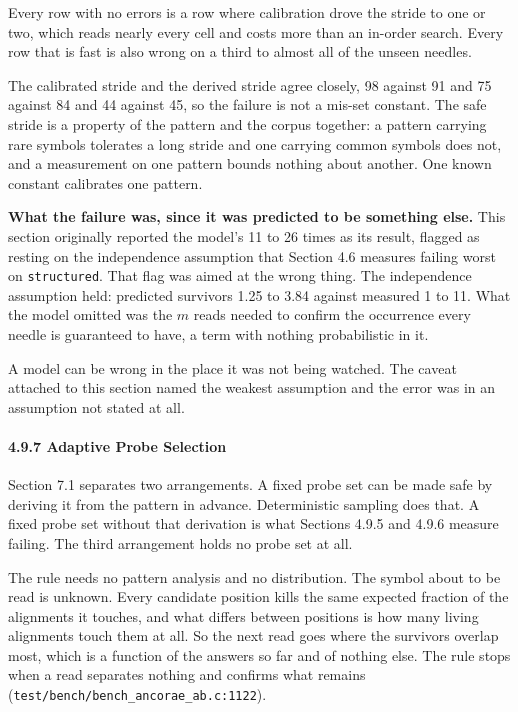 Every row with no errors is a row where calibration drove the stride to one or two, which reads nearly every cell and costs more than an in-order search. Every row that is fast is also wrong on a third to almost all of the unseen needles.

The calibrated stride and the derived stride agree closely, 98 against 91 and 75 against 84 and 44 against 45, so the failure is not a mis-set constant. The safe stride is a property of the pattern and the corpus together: a pattern carrying rare symbols tolerates a long stride and one carrying common symbols does not, and a measurement on one pattern bounds nothing about another. One known constant calibrates one pattern.

\noindent\textbf{What the failure was, since it was predicted to be something else.} This section originally reported the model's 11 to 26 times as its result, flagged as resting on the independence assumption that Section 4.6 measures failing worst on \texttt{structured}. That flag was aimed at the wrong thing. The independence assumption held: predicted survivors 1.25 to 3.84 against measured 1 to 11. What the model omitted was the \(m\) reads needed to confirm the occurrence every needle is guaranteed to have, a term with nothing probabilistic in it.

A model can be wrong in the place it was not being watched. The caveat attached to this section named the weakest assumption and the error was in an assumption not stated at all.

\paragraph{4.9.7 Adaptive Probe Selection}

Section 7.1 separates two arrangements. A fixed probe set can be made safe by deriving it from the pattern in advance. Deterministic sampling does that. A fixed probe set without that derivation is what Sections 4.9.5 and 4.9.6 measure failing. The third arrangement holds no probe set at all.

The rule needs no pattern analysis and no distribution. The symbol about to be read is unknown. Every candidate position kills the same expected fraction of the alignments it touches, and what differs between positions is how many living alignments touch them at all. So the next read goes where the survivors overlap most, which is a function of the answers so far and of nothing else. The rule stops when a read separates nothing and confirms what remains (\texttt{test/\allowbreak{}bench/\allowbreak{}bench\_\allowbreak{}ancorae\_\allowbreak{}ab.\allowbreak{}c:1122}).


